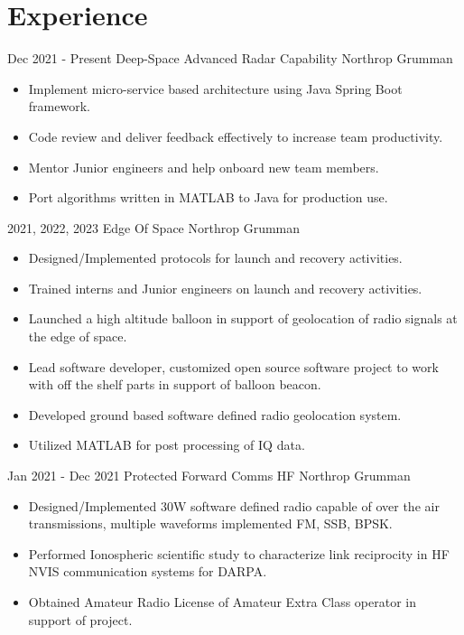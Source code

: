 \documentclass[]{src/friggeri-cv}
\begin{document}
\section{Experience}
\begin{entrylist}
  \entry
    {Dec 2021 - Present}
    {Deep-Space Advanced Radar Capability}
    {Northrop Grumman}
    {\begin{itemize}
        \item Implement micro-service based architecture using Java Spring Boot framework.
        \item Code review and deliver feedback effectively to increase team productivity.
        \item Mentor Junior engineers and help onboard new team members.
        \item Port algorithms written in MATLAB to Java for production use.
    \end{itemize}}
  \entry
    {2021, 2022, 2023}
    {Edge Of Space}
    {Northrop Grumman}
    {\begin{itemize}
        \item Designed/Implemented protocols for launch and recovery activities.
        \item Trained interns and Junior engineers on launch and recovery activities.
        \item Launched a high altitude balloon in support of geolocation of radio signals at the edge of space.
        \item Lead software developer, customized open source software project to work with off the shelf parts in support of balloon beacon.
        \item Developed ground based software defined radio geolocation system.
        \item Utilized MATLAB for post processing of IQ data.
    \end{itemize}}
  \entry
    {Jan 2021 - Dec 2021}
    {Protected Forward Comms HF}
    {Northrop Grumman}
    {\begin{itemize}
        \item Designed/Implemented 30W software defined radio capable of over the air transmissions, multiple waveforms implemented FM, SSB, BPSK.
        \item Performed Ionospheric scientific study to characterize link reciprocity in HF NVIS communication systems for DARPA.
        \item Obtained Amateur Radio License of Amateur Extra Class operator in support of project.
    \end{itemize}}

\end{entrylist}
\end{document}
